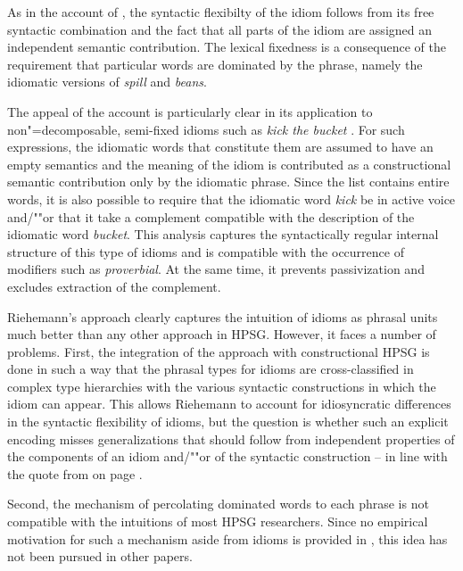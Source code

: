 \documentclass[output=paper
                ,modfonts
                ,nonflat
	        ,collection
	        ,collectionchapter
	        ,collectiontoclongg
 	        ,biblatex
                ,babelshorthands
                ,newtxmath
                ,draftmode
                ,colorlinks, citecolor=brown
]{./langsci/langscibook}
\begin{document}
As in the account of \citet{KE94a}, the syntactic flexibilty of the idiom follows from its free syntactic combination and the fact that all parts of the idiom are assigned an independent semantic contribution. The lexical fixedness is a consequence of the requirement that particular words are dominated by the phrase, namely the idiomatic versions of \emph{spill} and \emph{beans}.

The appeal of the account is particularly clear in its application to non"=de\-com\-posable, semi-fixed idioms such as \emph{kick the bucket} \citep[]{Riehemann2001a}. 
For such expressions, the idiomatic words that constitute them are assumed to have an empty semantics and the meaning of the idiom is contributed as a constructional semantic contribution only by the idiomatic phrase. 
Since the  list contains entire words, it is also possible to require that the idiomatic word \emph{kick} be in active voice and/""or that it take a complement compatible with the description of the idiomatic word \emph{bucket}.
This analysis captures the syntactically regular internal structure of this type of idioms and is compatible with the occurrence of modifiers such as \emph{proverbial}. At the same time, it prevents passivization and excludes extraction of the complement.

Riehemann's approach clearly captures the intuition of idioms as phrasal units much better than any other approach in HPSG. 
However, it faces a number of problems.
First, the integration of the approach with constructional HPSG is done in such a way that the phrasal types for idioms are cross-classified in complex type hierarchies with the various syntactic constructions in which the idiom can appear. 
This allows Riehemann to account for idiosyncratic differences in the syntactic flexibility of idioms, but the question is whether such an explicit encoding misses generalizations that should follow from independent properties of the components of an idiom and/""or of the syntactic construction -- in line with the quote from \citet{NSW94a} on page \pageref{NSW-quote}.


Second, the mechanism of percolating dominated words to each phrase is not compatible with the intuitions of most HPSG researchers. 
Since no empirical motivation for such a mechanism aside from idioms is provided in \citet{Riehemann2001a}, this idea has not been pursued in other papers. 
\end{document}
